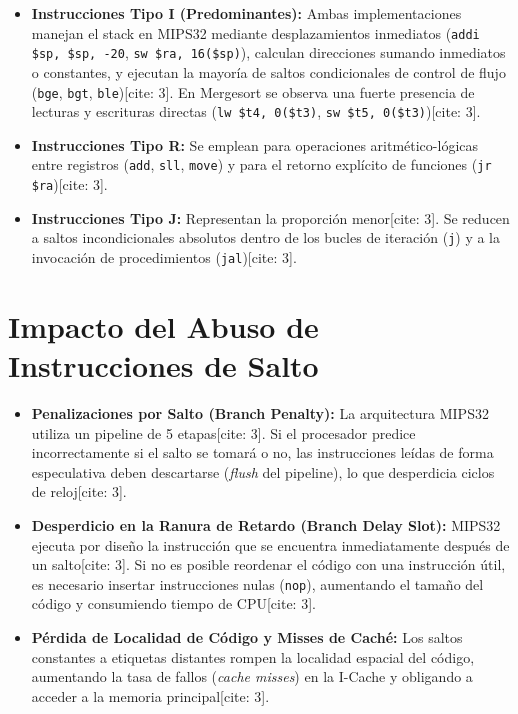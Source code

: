 \documentclass[12pt,a4paper]{article}
\begin{document}
\begin{itemize}
    \item \textbf{Instrucciones Tipo I (Predominantes):} Ambas implementaciones manejan el stack en MIPS32 mediante desplazamientos inmediatos (\texttt{addi \$sp, \$sp, -20}, \texttt{sw \$ra, 16(\$sp)}), calculan direcciones sumando inmediatos o constantes, y ejecutan la mayoría de saltos condicionales de control de flujo (\texttt{bge}, \texttt{bgt}, \texttt{ble})[cite: 3]. En Mergesort se observa una fuerte presencia de lecturas y escrituras directas (\texttt{lw \$t4, 0(\$t3)}, \texttt{sw \$t5, 0(\$t3)})[cite: 3].
    \item \textbf{Instrucciones Tipo R:} Se emplean para operaciones aritmético-lógicas entre registros (\texttt{add}, \texttt{sll}, \texttt{move}) y para el retorno explícito de funciones (\texttt{jr \$ra})[cite: 3].
    \item \textbf{Instrucciones Tipo J:} Representan la proporción menor[cite: 3]. Se reducen a saltos incondicionales absolutos dentro de los bucles de iteración (\texttt{j}) y a la invocación de procedimientos (\texttt{jal})[cite: 3].
\end{itemize}


\section{Impacto del Abuso de Instrucciones de Salto}

\begin{itemize}
    \item \textbf{Penalizaciones por Salto (Branch Penalty):} La arquitectura MIPS32 utiliza un pipeline de 5 etapas[cite: 3]. Si el procesador predice incorrectamente si el salto se tomará o no, las instrucciones leídas de forma especulativa deben descartarse (\textit{flush} del pipeline), lo que desperdicia ciclos de reloj[cite: 3].
    \item \textbf{Desperdicio en la Ranura de Retardo (Branch Delay Slot):} MIPS32 ejecuta por diseño la instrucción que se encuentra inmediatamente después de un salto[cite: 3]. Si no es posible reordenar el código con una instrucción útil, es necesario insertar instrucciones nulas (\texttt{nop}), aumentando el tamaño del código y consumiendo tiempo de CPU[cite: 3].
    \item \textbf{Pérdida de Localidad de Código y Misses de Caché:} Los saltos constantes a etiquetas distantes rompen la localidad espacial del código, aumentando la tasa de fallos (\textit{cache misses}) en la I-Cache y obligando a acceder a la memoria principal[cite: 3].
\end{itemize}
\end{document}
